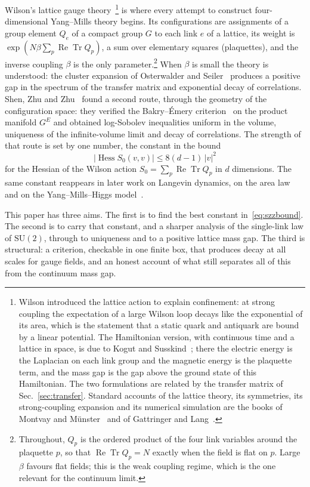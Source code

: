 \documentclass[aps,prd,twocolumn,superscriptaddress,nofootinbib,longbibliography,floatfix,amsmath,amssymb,10pt]{revtex4-2}
\theoremstyle{definition}
\theoremstyle{remark}
\newcommand{\SU}{\mathrm{SU}}
\newcommand{\ReTr}{\operatorname{Re}\operatorname{Tr}}
\newcommand{\Hess}{\operatorname{Hess}}
\begin{document}
Wilson's lattice gauge theory~\cite{Wil74}\footnote{Wilson introduced the
lattice action to explain confinement: at strong coupling the expectation of
a large Wilson loop decays like the exponential of its area, which is the
statement that a static quark and antiquark are bound by a linear potential.
The Hamiltonian version, with continuous time and a lattice in space, is due
to Kogut and Susskind~\cite{KS75}; there the electric energy is the Laplacian
on each link group and the magnetic energy is the plaquette term, and the
mass gap is the gap above the ground state of this Hamiltonian. The two
formulations are related by the transfer matrix of Sec.~\ref{sec:transfer}.
Standard accounts of the lattice theory, its symmetries, its strong-coupling
expansion and its numerical simulation are the books of Montvay and
M\"unster~\cite{MM94} and of Gattringer and Lang~\cite{GL10}.} is where every attempt to
construct four-dimensional Yang--Mills theory begins. Its configurations are
assignments of a group element $Q_e$ of a compact group $G$ to each link $e$
of a lattice, its weight is $\exp(N\beta\sum_p\ReTr Q_p)$, a sum over
elementary squares (plaquettes), and the inverse coupling $\beta$ is the only
parameter.\footnote{Throughout, $Q_p$ is the ordered product of the four link
variables around the plaquette $p$, so that $\ReTr Q_p=N$ exactly when the
field is flat on $p$. Large $\beta$ favours flat fields; this is the weak
coupling regime, which is the one relevant for the continuum limit.} When
$\beta$ is small the theory is understood: the cluster expansion of
Osterwalder and Seiler~\cite{OSei78,Sei82} produces a positive gap in the
spectrum of the transfer matrix and exponential decay of correlations.
Shen, Zhu and Zhu~\cite{SZZ23} found a second route, through the geometry of
the configuration space: they verified the Bakry--\'Emery
criterion~\cite{BE85,BGL14} on the product manifold $G^E$ and obtained
log-Sobolev inequalities uniform in the volume, uniqueness of the
infinite-volume limit and decay of correlations. The strength of that route
is set by one number, the constant in the bound
\begin{equation}\label{eq:szzbound}
|\Hess S_0(v,v)|\le 8(d-1)\,|v|^2
\end{equation}
for the Hessian of the Wilson action $S_0=\sum_p\ReTr Q_p$ in $d$ dimensions.
The same constant reappears in later work on Langevin dynamics, on the area
law and on the Yang--Mills--Higgs model~\cite{CNS25b,Nis25,SSZ26}.

This paper has three aims. The first is to find the best constant
in~\eqref{eq:szzbound}. The second is to carry that constant, and a sharper
analysis of the single-link law of $\SU(2)$, through to uniqueness and to a
positive lattice mass gap. The third is structural: a criterion, checkable
in one finite box, that produces decay at all scales for gauge fields, and an
honest account of what still separates all of this from the continuum mass
gap.
\end{document}
